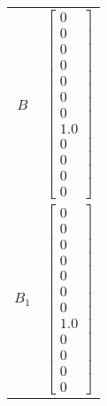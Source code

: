 \begin{tabular}{cl}
   $B$    & $\left[\begin{matrix}0\\0\\0\\0\\0\\0\\0\\1.0\\0\\0\\0\\0\end{matrix}\right]$                                                                                                                                                                                                                                                                                                                                                                                                                                                                                                                                                                                                                                                                                                           \\
 $B_{1}$  & $\left[\begin{matrix}0\\0\\0\\0\\0\\0\\0\\1.0\\0\\0\\0\\0\end{matrix}\right]$                                                                                                                                                                                                                                                                                                                                                                                                                                                                                                                                                                                                                                                                                                           \\

\end{tabular}
